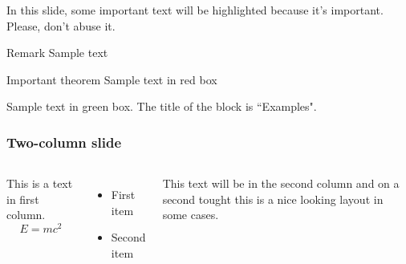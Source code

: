 \documentclass{beamer}
\begin{document}
{\begin{frame}
In this slide, some important text will be
\alert{highlighted} because it's important.
Please, don't abuse it.

\begin{block}{Remark}
Sample text
\end{block}

\begin{alertblock}{Important theorem}
Sample text in red box
\end{alertblock}

\begin{examples}
Sample text in green box. The title of the block is ``Examples".
\end{examples}
\end{frame}


\begin{frame}
\frametitle{Two-column slide}

\begin{columns}

This is a text in first column.
$$E=mc^2$$
\begin{itemize}
\item First item
\item Second item
\end{itemize}

This text will be in the second column
and on a second tought this is a nice looking
layout in some cases.
\end{columns}
\end{frame}
} 
\end{document}
